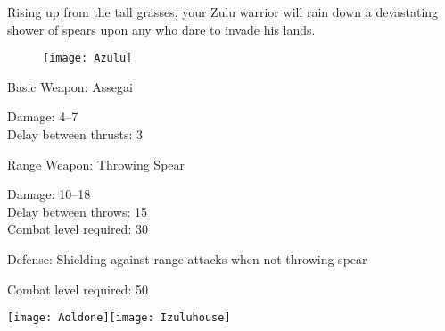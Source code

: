Rising up from the tall grasses, your Zulu warrior will rain down a devastating shower of spears upon any who dare to invade his lands.
	
\begin{wrapfigure}{r}{0.5\textwidth}
	\begin{center}
		\vspace{-20pt}
		\texttt{[image: Azulu]}
	\end{center}
	\vspace{-20pt}
\end{wrapfigure}

Basic Weapon: Assegai
\begin{adjustwidth}{1cm}{}
	Damage: 4–7 \\
	Delay between thrusts: 3
\end{adjustwidth}
Range Weapon: Throwing Spear
\begin{adjustwidth}{1cm}{}
	Damage: 10–18 \\
	Delay between throws: 15 \\
	Combat level required: 30
\end{adjustwidth}
Defense: Shielding against range attacks when not throwing spear
\begin{adjustwidth}{1cm}{}
	Combat level required: 50
\end{adjustwidth}

\begin{center}
	\texttt{[image: Aoldone]}\hspace{1pt}\texttt{[image: Izuluhouse]}
\end{center}